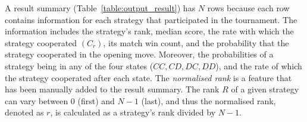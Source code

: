 A result summary (Table~\ref{table:output_result}) has \(N\) rows
because each row contains information for each strategy that participated in the
tournament. The information includes the strategy's rank, median score, the rate
with which the strategy cooperated $(C_r)$, its match win count, and the
probability that the strategy cooperated in the opening move. Moreover, the
probabilities of a strategy being in any of the four states ($CC, CD, DC, DD$),
and the rate of which the strategy cooperated after each state. The \textit{normalised rank}
is a feature that has been manually added to the result summary. The rank \(R\) of a given
strategy can vary between 0 (first) and \(N-1\) (last), and thus the normalised rank,
denoted as $r$, is calculated as a strategy's rank divided by \(N - 1\).

\begin{table}[!htbp]
    \begin{center}
\end{center}
\caption{Output result of a single tournament.}\label{table:output_result}
\end{table}

